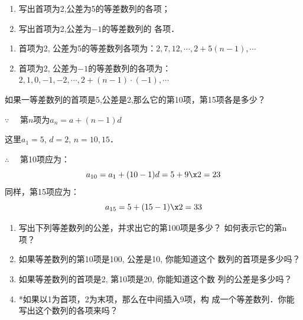 \begin{example}
\begin{enumerate}
    \item 写出首项为2,公差为5的等差数列的各项；
    \item 写出首项为2,公差为$-1$的等差数列的
各项．
\end{enumerate}    
\end{example}

\begin{solution}
\begin{enumerate}
    \item 首项为2, 公差为5的等差数列各项为：$2, 7, 12, \cdots, 2+5 (n-1) ,\cdots$
    \item 首项为2, 公差为$-1$的等差数列的各项为：
    $2, 1, 0, -1, -2, \cdots, 2+ (n-1)\cdot(-1) ,\cdots$
\end{enumerate}
\end{solution}

\begin{example}
    如果一等差数列的首项是5,公差是2,那么它的第10项，第15项各是多少？
\end{example}

\begin{solution}
   $\because\quad $ 第$n$项为$a_n=a+(n-1)d$

这里$a_1=5$, $d=2$, $n=10, 15$．

$\therefore\quad $ 第10项应为：
\[
    a_{10}=a_1+ (10-1) d\\
=5+9\x2=23
\]
同样，第15项应为：
\[a_{15}=5+ (15-1) \x2=33\]
\end{solution}

\begin{ex}
\begin{enumerate}
\item 写出下列等差数列的公差，并求出它的第100项是多少？
如何表示它的第n项？
\begin{enumerate}
\end{enumerate} 
\item 如果等差数列的第10项是100, 公差是10, 你能知道这个
数列的首项是多少吗？
\item 如果等差数列的首项是2, 第10项是20, 你能知道这个数
列的公差是多少吗？
\item *如果以1为首项，2为末项，那么在中间插入9项，构
成一个等差数列．你能写出这个数列的各项来吗？
\end{enumerate}
\end{ex}

